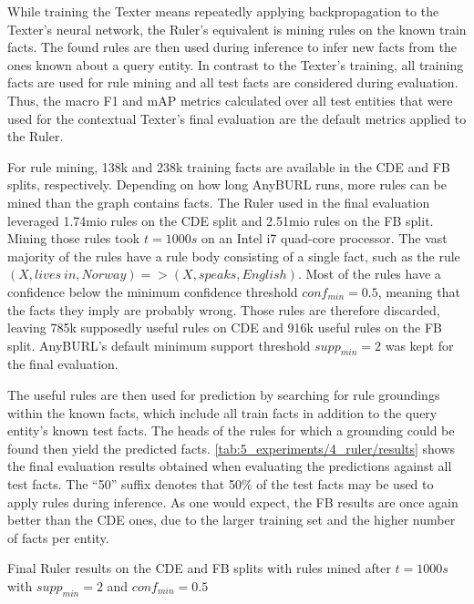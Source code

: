 While training the Texter means repeatedly applying backpropagation to the Texter's neural network, the Ruler's equivalent is mining rules on the known train facts. The found rules are then used during inference to infer new facts from the ones known about a query entity. In contrast to the Texter's training, all training facts are used for rule mining and all test facts are considered during evaluation. Thus, the macro F1 and mAP metrics calculated over all test entities that were used for the contextual Texter's final evaluation are the default metrics applied to the Ruler.

For rule mining, 138k and 238k training facts are available in the CDE and FB splits, respectively. Depending on how long AnyBURL runs, more rules can be mined than the graph contains facts. The Ruler used in the final evaluation leveraged 1.74mio rules on the CDE split and 2.51mio rules on the FB split. Mining those rules took $t = 1000s$ on an Intel i7 quad-core processor. The vast majority of the rules have a rule body consisting of a single fact, such as the rule $(X, lives~in, Norway) => (X, speaks, English)$. Most of the rules have a confidence below the minimum confidence threshold $conf_{min} = 0.5$, meaning that the facts they imply are probably wrong. Those rules are therefore discarded, leaving 785k supposedly useful rules on CDE and 916k useful rules on the FB split. AnyBURL's default minimum support threshold $supp_{min} = 2$ was kept for the final evaluation.

The useful rules are then used for prediction by searching for rule groundings within the known facts, which include all train facts in addition to the query entity's known test facts. The heads of the rules for which a grounding could be found then yield the predicted facts. \autoref{tab:5_experiments/4_ruler/results} shows the final evaluation results obtained when evaluating the predictions against all test facts. The ``50'' suffix denotes that 50\% of the test facts may be used to apply rules during inference. As one would expect, the FB results are once again better than the CDE ones, due to the larger training set and the higher number of facts per entity.

\begin{table}[h]
    \centering
    
    \caption{Final Ruler results on the CDE and FB splits with rules mined after $t = 1000s$ with $supp_{min} = 2$ and $conf_{min} = 0.5$}
    \label{tab:5_experiments/4_ruler/results}
\end{table}

